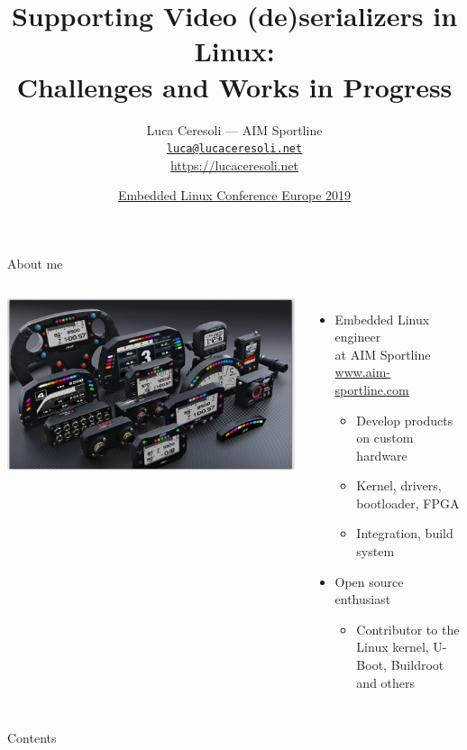 \documentclass[xetex,table,aspectratio=169]{beamer}
\title{Supporting Video (de)serializers in Linux:\\Challenges and Works in Progress}
\author{Luca Ceresoli --- AIM Sportline\\
  \href{mailto:luca@lucaceresoli.net}{\tt luca@lucaceresoli.net}\\
  \url{https://lucaceresoli.net}
}
\date{\href{https://events19.linuxfoundation.org/events/embedded-linux-conference-europe-2019/}{Embedded Linux Conference Europe 2019}}
\begin{document}
\maketitle

\begin{frame}{About me}
  \begin{columns}
    \includegraphics[width=\textwidth]{../common/images/aim-products.jpg}

    \begin{itemize}
    \item Embedded Linux engineer\\
      at AIM Sportline\\
      {\footnotesize\href{https://www.aim-sportline.com/}{www.aim-sportline.com}}
      \begin{itemize}
      \item Develop products on custom hardware
      \item Kernel, drivers, bootloader, FPGA
      \item Integration, build system
      \end{itemize}
    \item Open source enthusiast
      \begin{itemize}
      \item Contributor to the Linux kernel, U-Boot, Buildroot and others
      \end{itemize}
    \end{itemize}
  \end{columns}
\end{frame}


\begin{frame}{Contents}
  \tableofcontents
\end{frame}
\end{document}
